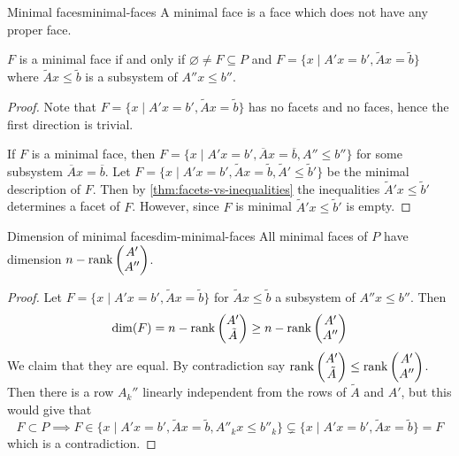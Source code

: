 \documentclass[12pt]{extarticle}
\begin{document}
\begin{definition}{Minimal faces}{minimal-faces}
	A minimal face is a face which does not have any proper face.
\end{definition}

\begin{lemma}{}{}
	$F$ is a minimal face if and only if $\varnothing \neq F \subseteq P$ and
	$F = \{ x \mid A'x = b', \tilde A x = \tilde b \}$
	where $\tilde A x \leq \tilde b$ is a subsystem of $A'' x \leq b''$.
\end{lemma}

\begin{proof}
	Note that $F = \{ x \mid A'x = b', \tilde A x = \tilde b \}$ has no facets and no faces,
	hence the first direction is trivial.

	If $F$ is a minimal face, then
	$F = \{ x \mid A'x = b', \overline A x = \overline b, A'' \leq b'' \}$ for some subsystem
	$\overline A x = \overline b$.
	Let $F = \{ x \mid A'x = b', \tilde A x = \tilde b, \tilde A' \leq \tilde b' \}$
	be the minimal description of $F$.
	Then by \cref{thm:facets-vs-inequalities} the inequalities $\tilde A'x \leq \tilde b'$ determines
	a facet of $F$. However, since $F$ is minimal $\tilde A'x \leq \tilde b'$ is empty.
\end{proof}

\begin{theorem}{Dimension of minimal faces}{dim-minimal-faces}
	All minimal faces of $P$ have dimension $n - \rank\begin{pmatrix} A' \\ A'' \end{pmatrix}$.
\end{theorem}

\begin{proof}
	Let $F = \{ x \mid A'x = b', \tilde A x = \tilde b\}$ for $\tilde A x \leq \tilde b$ a subsystem
	of $A'' x \leq b''$.
	Then
	\begin{equation}
		\dim(F) = n- \rank\begin{pmatrix} A' \\ \tilde A \end{pmatrix}
		\geq n - \rank\begin{pmatrix} A' \\ A''\end{pmatrix}
	\end{equation}
	We claim that they are equal.
	By contradiction say $\rank \begin{pmatrix} A' \\ \tilde A \end{pmatrix} \leq
		\rank \begin{pmatrix} A' \\ A'' \end{pmatrix}$.
	Then there is a row $A_k''$ linearly independent from the rows of $\tilde A$ and $A'$, but this
	would give that
	\begin{equation}
		F \subset P \implies F \in \{ x \mid A'x = b', \tilde A x = \tilde b, A''_k x \leq b''_k\}
		\subsetneq \{ x \mid A'x = b', \tilde A x = \tilde b\} = F
	\end{equation}
	which is a contradiction.
\end{proof}
\end{document}
